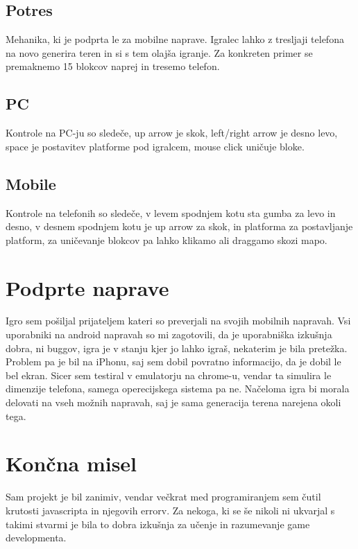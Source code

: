 \documentclass[a4paper,11pt]{article}
\begin{document}
\subsection{Potres}
Mehanika, ki je podprta le za mobilne naprave. Igralec lahko z tresljaji telefona na novo generira teren in si s tem olajša igranje. Za konkreten primer se premaknemo 15 blokcov naprej in tresemo telefon.

\subsection{PC}
Kontrole na PC-ju so sledeče, up arrow je skok, left/right arrow je desno levo, space je postavitev platforme pod igralcem, mouse click uničuje bloke.

\subsection{Mobile}
Kontrole na telefonih so sledeče, v levem spodnjem kotu sta gumba za levo in desno, v desnem spodnjem kotu je up arrow za skok, in platforma za postavljanje platform, za uničevanje blokcov pa lahko klikamo ali draggamo skozi mapo.

\section{Podprte naprave}

Igro sem pošiljal prijateljem kateri so preverjali na svojih mobilnih napravah. Vsi uporabniki na android napravah so mi zagotovili, da je uporabniška izkušnja dobra, ni buggov, igra je v stanju kjer jo lahko igraš, nekaterim je bila pretežka. Problem pa je bil na iPhonu, saj sem dobil povratno informacijo, da je dobil le bel ekran. Sicer sem testiral v emulatorju na chrome-u, vendar ta simulira le dimenzije telefona, samega operecijskega sistema pa ne. Načeloma igra bi morala delovati na vseh možnih napravah, saj je sama generacija terena narejena okoli tega.

\section{Končna misel}

Sam projekt je bil zanimiv, vendar večkrat med programiranjem sem čutil krutosti javascripta in njegovih errorv. Za nekoga, ki se še nikoli ni ukvarjal s takimi stvarmi je bila to dobra izkušnja za učenje in razumevanje game developmenta. 
\end{document}
